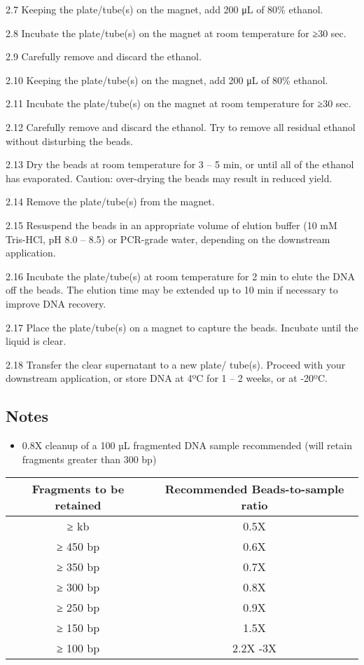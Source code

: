 \documentclass[
  letterpaper,
  DIV=11,
  numbers=noendperiod]{scrreprt}
\providecommand{\tightlist}{%
  \setlength{\itemsep}{0pt}\setlength{\parskip}{0pt}}\usepackage{longtable,booktabs,array}
\begin{document}
2.7 Keeping the plate/tube(s) on the magnet, add 200 μL of 80\% ethanol.

2.8 Incubate the plate/tube(s) on the magnet at room temperature for ≥30
sec.

2.9 Carefully remove and discard the ethanol.

2.10 Keeping the plate/tube(s) on the magnet, add 200 μL of 80\%
ethanol.

2.11 Incubate the plate/tube(s) on the magnet at room temperature for
≥30 sec.

2.12 Carefully remove and discard the ethanol. Try to remove all
residual ethanol without disturbing the beads.

2.13 Dry the beads at room temperature for 3 -- 5 min, or until all of
the ethanol has evaporated. Caution: over-drying the beads may result in
reduced yield.

2.14 Remove the plate/tube(s) from the magnet.

2.15 Resuspend the beads in an appropriate volume of elution buffer (10
mM Tris-HCl, pH 8.0 -- 8.5) or PCR-grade water, depending on the
downstream application.

2.16 Incubate the plate/tube(s) at room temperature for 2 min to elute
the DNA off the beads. The elution time may be extended up to 10 min if
necessary to improve DNA recovery.

2.17 Place the plate/tube(s) on a magnet to capture the beads. Incubate
until the liquid is clear.

2.18 Transfer the clear supernatant to a new plate/ tube(s). Proceed
with your downstream application, or store DNA at 4ºC for 1 -- 2 weeks,
or at -20ºC.

\hypertarget{notes-1}{%
\subsection*{\texorpdfstring{\textbf{Notes}}{Notes}}\label{notes-1}}

\begin{itemize}
\tightlist
\item
  0.8X cleanup of a 100 µL fragmented DNA sample recommended (will
  retain fragments greater than 300 bp)
\end{itemize}

\begin{longtable}[]{@{}cc@{}}
\toprule()
\textbf{Fragments to be retained} & \textbf{Recommended Beads-to-sample
ratio} \\
\midrule()
\endhead
≥ kb & 0.5X \\
≥ 450 bp & 0.6X \\
≥ 350 bp & 0.7X \\
≥ 300 bp & 0.8X \\
≥ 250 bp & 0.9X \\
≥ 150 bp & 1.5X \\
≥ 100 bp & 2.2X -3X \\
\bottomrule()
\end{longtable}
\end{document}
